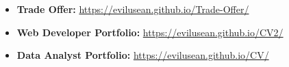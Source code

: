 
\begin{itemize}
  \item \textbf{Trade Offer:} \url{https://evilusean.github.io/Trade-Offer/}
  \item \textbf{Web Developer Portfolio:} \url{https://evilusean.github.io/CV2/}
  \item \textbf{Data Analyst Portfolio:} \url{https://evilusean.github.io/CV/}
\end{itemize}